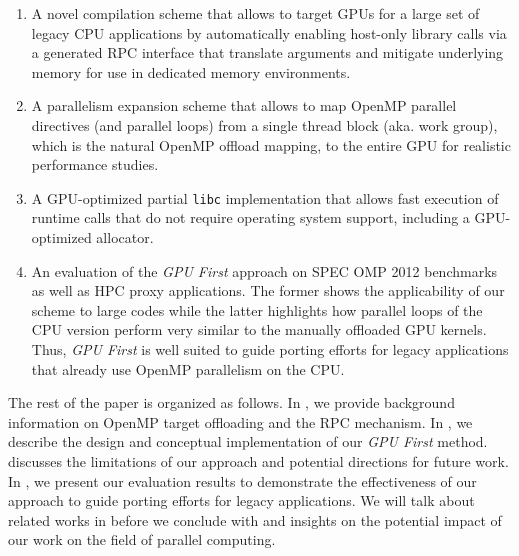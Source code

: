 \begin{enumerate}
\item A novel compilation scheme that allows to target GPUs for a large set of legacy CPU applications by automatically enabling host-only library calls via a generated RPC interface that translate arguments and mitigate underlying memory for use in dedicated memory environments.
\item A parallelism expansion scheme that allows to map OpenMP parallel directives (and parallel loops) from a single thread block (aka. work group), which is the natural OpenMP offload mapping, to the entire GPU for realistic performance studies.
\item A GPU-optimized partial \texttt{libc} implementation that allows fast execution of runtime calls that do not require operating system support, including a GPU-optimized allocator.
\item An evaluation of the \emph{GPU First} approach on SPEC OMP 2012 benchmarks as well as HPC proxy applications. The former shows the applicability of our scheme to large codes while the latter highlights how parallel loops of the CPU version perform very similar to the manually offloaded GPU kernels. Thus, \emph{GPU First} is well suited to guide porting efforts for legacy applications that already use OpenMP parallelism on the CPU.
\end{enumerate}

The rest of the paper is organized as follows.
In , we provide background information on OpenMP target offloading and the RPC mechanism.
In , we describe the design and conceptual implementation of our \emph{GPU First} method.
 discusses the limitations of our approach and potential directions for future work.
In , we present our evaluation results to demonstrate the effectiveness of our approach to guide porting efforts for legacy applications.
We will talk about related works in  before we conclude with  and insights on the potential impact of our work on the field of parallel computing.